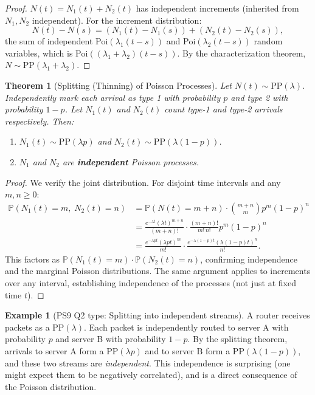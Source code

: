\documentclass[12pt, a4paper]{article}
\theoremstyle{definition}
\newtheorem{example}{Example}[section]
\theoremstyle{plain}
\newtheorem{theorem}{Theorem}[section]
\newcommand{\PP}{\mathbb{P}}
\begin{document}
\begin{proof}
$N(t) = N_1(t) + N_2(t)$ has independent increments (inherited from $N_1, N_2$ independent). For the increment distribution:
\[
  N(t) - N(s) = (N_1(t)-N_1(s)) + (N_2(t)-N_2(s)),
\]
the sum of independent $\text{Poi}(\lambda_1(t-s))$ and $\text{Poi}(\lambda_2(t-s))$ random variables, which is $\text{Poi}((\lambda_1+\lambda_2)(t-s))$. By the characterization theorem, $N \sim \text{PP}(\lambda_1+\lambda_2)$.
\end{proof}

\begin{theorem}[Splitting (Thinning) of Poisson Processes]
Let $N(t) \sim \text{PP}(\lambda)$. Independently mark each arrival as type 1 with probability $p$ and type 2 with probability $1-p$. Let $N_1(t)$ and $N_2(t)$ count type-1 and type-2 arrivals respectively. Then:
\begin{enumerate}[label=(\roman*)]
  \item $N_1(t) \sim \text{PP}(\lambda p)$ and $N_2(t) \sim \text{PP}(\lambda(1-p))$.
  \item $N_1$ and $N_2$ are \textbf{independent} Poisson processes.
\end{enumerate}
\end{theorem}

\begin{proof}
We verify the joint distribution. For disjoint time intervals and any $m, n \ge 0$:
\begin{align*}
  \PP(N_1(t) = m,\; N_2(t) = n) &= \PP(N(t) = m+n) \cdot \binom{m+n}{m} p^m (1-p)^n \\
  &= \frac{e^{-\lambda t}(\lambda t)^{m+n}}{(m+n)!} \cdot \frac{(m+n)!}{m!\, n!} p^m (1-p)^n \\
  &= \frac{e^{-\lambda p t}(\lambda p t)^m}{m!} \cdot \frac{e^{-\lambda(1-p)t}(\lambda(1-p)t)^n}{n!}.
\end{align*}
This factors as $\PP(N_1(t)=m) \cdot \PP(N_2(t)=n)$, confirming independence and the marginal Poisson distributions. The same argument applies to increments over any interval, establishing independence of the processes (not just at fixed time $t$).
\end{proof}

\begin{example}[PS9 Q2 type: Splitting into independent streams]
A router receives packets as a $\text{PP}(\lambda)$. Each packet is independently routed to server A with probability $p$ and server B with probability $1-p$. By the splitting theorem, arrivals to server A form a $\text{PP}(\lambda p)$ and to server B form a $\text{PP}(\lambda(1-p))$, and these two streams are \emph{independent}. This independence is surprising (one might expect them to be negatively correlated), and is a direct consequence of the Poisson distribution.
\end{example}
\end{document}
